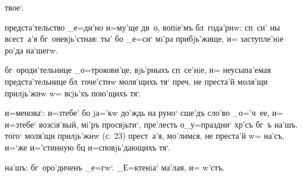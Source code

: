 твое`.

предста'тельство _е=ди'но и=му'ще дв~о, вопiе'мъ 
бл~года'рнw: сп~си' ны всест~а'я бг~оневjь'стная: ты' бо 
_е=си` мi'ра прибjь'жище, и= заступле'нiе ро'да на'шегw.


бг~ороди'тельнице _о=трокови'це, вjь'рныхъ сп~се'нiе, и= 
неусыпа'емая предста'тельнице бл~гоче'стнw моля'щихъ тя` 
преч, не преста'й моля'щи прилjь'жнw w= всjь'хъ 
пою'щихъ тя`.


и=менова`: и=з\ъ тебе' бо jа='кw до'ждь на руно` сше'дъ 
сло'во _о='ч~ее, и= и=з\ъ тебе` возсiя'вый, мi'ръ 
просвjьти`, пре'лесть о_у=праздни` хр'съ бг~ъ на'шъ. 
того` моля'щи прилjь'жнw (с. 23) прест~а'я, мо'лимся, не 
преста'й w= на'съ, и=`же и='стинную бц 
и=сповjь'дающихъ тя`.

на'шъ: %
бг~оро'диченъ _е=гw`. _Е=ктенiа` ма'лая, и= w'стъ.%
